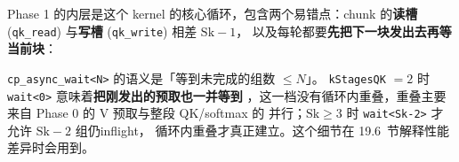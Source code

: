Phase 1 的内层是这个 kernel 的核心循环，包含两个易错点：chunk 的\textbf{读槽}
(\texttt{qk\_read}) 与\textbf{写槽} (\texttt{qk\_write}) 相差 $\mathrm{Sk}-1$，
以及每轮都要\textbf{先把下一块发出去再等当前块}：



\texttt{cp\_\allowbreak{}async\_\allowbreak{}wait\allowbreak{}<N>} 的语义是「等到未完成的组数 $\le N$」。
\texttt{kStagesQK} $=2$ 时 \texttt{wait<0>} 意味着\textbf{把刚发出的预取也一并等到}
，这一档没有循环内重叠，重叠主要来自 Phase 0 的 V 预取与整段 QK/softmax 的
并行；$\mathrm{Sk} \ge 3$ 时 \texttt{wait<Sk-2>} 才允许 $\mathrm{Sk}-2$ 组仍inflight，
循环内重叠才真正建立。这个细节在 19.6~节解释性能差异时会用到。

